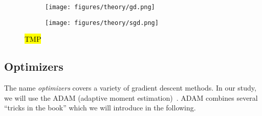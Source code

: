 \begin{figure}[H]
  \centering
  \begin{subfigure}[t]{0.49\textwidth}
    \centering
    \texttt{[image: figures/theory/gd.png]}
    \caption{}
    \label{fig:gd}
  \end{subfigure}
  \hfill
  \begin{subfigure}[t]{0.49\textwidth}
    \centering
    \texttt{[image: figures/theory/sgd.png]}
    \caption{}
    \label{fig:sgd}
  \end{subfigure}
  \hfill
  \caption{\hl{TMP}}
  \label{fig:gradient_descent}
\end{figure}



\subsection{Optimizers}
The name \textit{optimizers} covers a variety of gradient descent methods. In our study, we will use the ADAM (adaptive moment estimation)~\cite{kingma2017adam}. ADAM combines several ``tricks in the book'' which we will introduce in the following.

